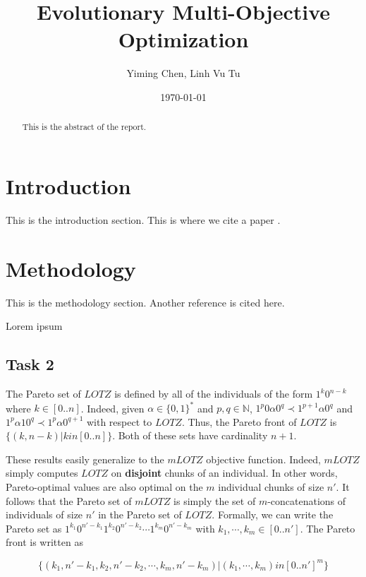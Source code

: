 \documentclass[english]{article}
\begin{document}

\title{Evolutionary Multi-Objective Optimization}
\author{Yiming Chen, Linh Vu Tu}
\date{\today}

\maketitle

\begin{abstract}
    This is the abstract of the report.
\end{abstract}

\section{Introduction}
This is the introduction section. This is where we cite a paper \cite{example2025}.

\section{Methodology}
This is the methodology section. Another reference \cite{samplebook2024} is cited here.

Lorem ipsum

\subsection{Task 2}

The Pareto set of $LOTZ$ is defined by all of the individuals of the form $1^k
    0^{n-k}$ where $k \in [0..n]$. Indeed, given $\alpha \in \{0, 1\}^*$ and $p,
    q \in \mathbb{N}$, $1^p 0 \alpha 0^q \prec 1^{p+1} \alpha 0^q$ and $1^p
    \alpha 1 0^q \prec 1^p \alpha 0^{q+1}$ with respect to $LOTZ$. Thus, the
Pareto front of $LOTZ$ is $\{ (k, n - k) | k in [0..n] \}$. Both of these
sets have cardinality $n + 1$.

These results easily generalize to the $mLOTZ$ objective function. Indeed,
$mLOTZ$ simply computes $LOTZ$ on \textbf{disjoint} chunks of an individual. In
other words, Pareto-optimal values are also optimal on the $m$ individual chunks
of size $n'$. It follows that the Pareto set of $mLOTZ$ is simply the set of
$m$-concatenations of individuals of size $n'$ in the Pareto set of $LOTZ$.
Formally, we can write the Pareto set as $1^{k_1} 0^{n' - k_1} 1^{k_2} 0^{n' -
            k_2} \cdots 1^{k_m} 0^{n' - k_m}$ with $k_1, \cdots, k_m \in [0..n']$. The
Pareto front is written as

$$\{ (k_1, n' - k_1, k_2, n' - k_2, \cdots, k_m, n' - k_m) | (k_1, \cdots, k_m)
    in [0..n']^m \}$$
\end{document}
